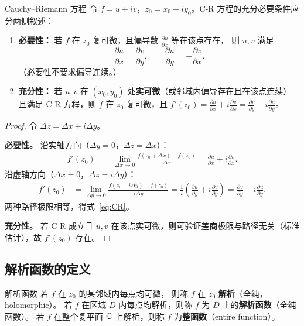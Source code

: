 \begin{theorem}{Cauchy--Riemann 方程}{}
\label{thm:CR}
令 $f=u+iv$，$z_0=x_0+iy_0$。C-R 方程的充分必要条件应分两侧叙述：
\begin{enumerate}
  \item \textbf{必要性：} 若 $f$ 在 $z_0$ 复可微，且偏导数 $\frac{\partial u}{\partial x}$ 等在该点存在，
  则 $u,v$ 满足
\begin{equation}
    \frac{\partial u}{\partial x} = \frac{\partial v}{\partial y},
    \qquad
    \frac{\partial u}{\partial y} = -\frac{\partial v}{\partial x}.
  \label{eq:CR}
\end{equation}
  （必要性不要求偏导连续。）
  \item \textbf{充分性：} 若 $u,v$ 在 $(x_0,y_0)$ 处\textbf{实可微}（或邻域内偏导存在且在该点连续）
  且满足 C-R 方程，则 $f$ 在 $z_0$ 复可微，且
  $f'(z_0)=\frac{\partial u}{\partial x}+i\frac{\partial v}{\partial x}
  =\frac{\partial v}{\partial y}-i\frac{\partial u}{\partial y}$。
\end{enumerate}
\end{theorem}

\begin{proof}
令 $\Delta z = \Delta x + i\Delta y$。

\textbf{必要性。} 沿实轴方向（$\Delta y=0$，$\Delta z=\Delta x$）：
\begin{align}
  f'(z_0) &= \lim_{\Delta x\to0}\frac{f(z_0+\Delta x)-f(z_0)}{\Delta x}
  = \frac{\partial u}{\partial x}+i\frac{\partial v}{\partial x}.
\end{align}
沿虚轴方向（$\Delta x=0$，$\Delta z=i\Delta y$）：
\begin{align}
  f'(z_0) &= \lim_{\Delta y\to0}\frac{f(z_0+i\Delta y)-f(z_0)}{i\Delta y}
  = \frac{1}{i}\!\left(\frac{\partial u}{\partial y}+i\frac{\partial v}{\partial y}\right)
  = \frac{\partial v}{\partial y}-i\frac{\partial u}{\partial y}.
\end{align}
两种路径极限相等，得式~\eqref{eq:CR}。

\textbf{充分性。} 若 C-R 成立且 $u,v$ 在该点实可微，则可验证差商极限与路径无关（标准估计），故 $f'(z_0)$ 存在。
\end{proof}

\subsection{解析函数的定义}

\begin{definition}{解析函数}{}
\label{def:analytic}
若 $f$ 在 $z_0$ 的某邻域内每点均可微，
则称 $f$ 在 $z_0$ \textbf{解析}（全纯，holomorphic）。
若 $f$ 在区域 $D$ 内每点均解析，则称 $f$ 为 $D$ 上的\textbf{解析函数}（全纯函数）。
若 $f$ 在整个复平面 $\mathbb{C}$ 上解析，则称 $f$ 为\textbf{整函数}（entire function）。
\end{definition}


